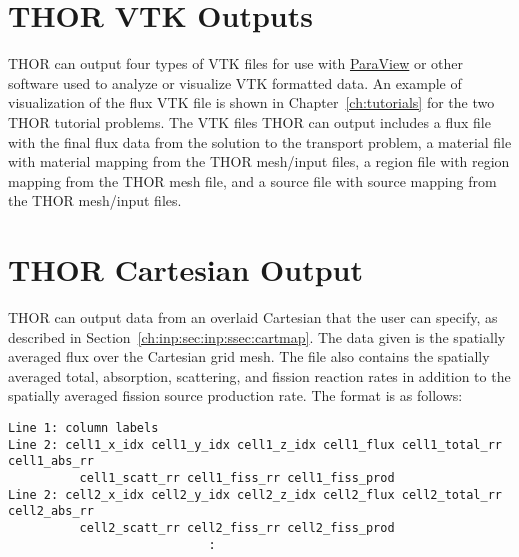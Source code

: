 \section{THOR VTK Outputs}\label{ch:out:sec:vtk}

THOR can output four types of VTK files for use with \href{https://www.paraview.org/}{ParaView} or other software used to analyze or visualize VTK formatted data.
An example of visualization of the flux VTK file is shown in Chapter~\ref{ch:tutorials} for the two THOR tutorial problems.
The VTK files THOR can output includes a flux file with the final flux data from the solution to the transport problem, a material file with material mapping from the THOR mesh/input files, a region file with region mapping from the THOR mesh file, and a source file with source mapping from the THOR mesh/input files.

\section{THOR Cartesian Output}\label{ch:out:sec:cart}

THOR can output data from an overlaid Cartesian that the user can specify, as described in Section~\ref{ch:inp:sec:inp:ssec:cartmap}.
The data given is the spatially averaged flux over the Cartesian grid mesh.
The file also contains the spatially averaged total, absorption, scattering, and fission reaction rates in addition to the spatially averaged fission source production rate.
The format is as follows:
\begin{verbatim}
Line 1: column labels
Line 2: cell1_x_idx cell1_y_idx cell1_z_idx cell1_flux cell1_total_rr cell1_abs_rr
          cell1_scatt_rr cell1_fiss_rr cell1_fiss_prod
Line 2: cell2_x_idx cell2_y_idx cell2_z_idx cell2_flux cell2_total_rr cell2_abs_rr
          cell2_scatt_rr cell2_fiss_rr cell2_fiss_prod
                            :
\end{verbatim}